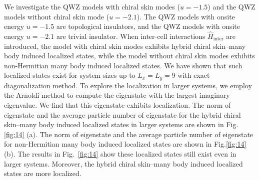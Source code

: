 \documentclass[longbibliography, aps, prx, amsmath, amssymb, amsfonts, twocolumn,superscriptaddress, footinbib]{revtex4-1}
\begin{document}
	We investigate the QWZ models with chiral skin modes ($u = -1.5$) and the QWZ models without chiral skin mode ($u = -2.1$). The QWZ models with onsite energy $u=-1.5$ are topological insulators, and the QWZ models with onsite energy $u = -2.1$ are trivial insulator. When inter-cell interactions $\hat{H}_{\text{inter}}$ are introduced, the model with chiral skin modes exhibits hybrid chiral skin–many body induced localized states, while the model without chiral skin modes exhibits non-Hermitian many body induced localized states.
	We have shown that such localized states exist for system sizes up to $L_x = L_y = 9$ with exact diagonalization method. To explore the localization in larger systems, we employ the Arnoldi method to compute the eigenstate with the largest imaginary eigenvalue. 
	We find that this eigenstate exhibits localization.
	The norm of eigenstate and the average particle number of eigenstate for the hybrid chiral skin–many body induced localized states in larger systems are shown in Fig.\ref{fig:14}  (a). 
	The norm of eigenstate and the average particle number of eigenstate for non-Hermitian many body induced localized states are shown in Fig.\ref{fig:14} (b). The results in Fig.~\ref{fig:14} show these localized states still exist even in larger systems. Moreover, the hybrid chiral skin–many body induced localized states are more localized.

\end{document}
